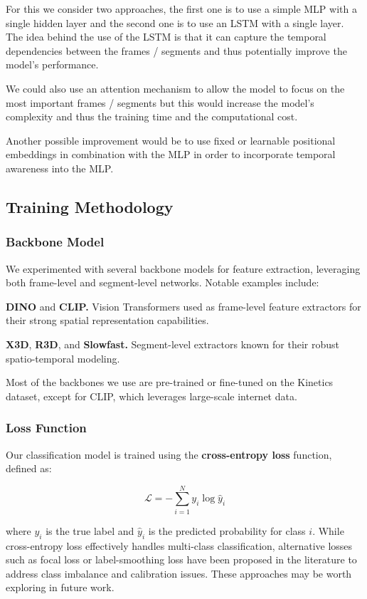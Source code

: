 For this we consider two approaches, the first one is to use a simple MLP with a single hidden layer and the second one is to use an LSTM with a single layer. The idea behind the use of the LSTM is that it can capture the temporal dependencies between the frames / segments and thus potentially improve the model's performance.

We could also use an attention mechanism to allow the model to focus on the most important frames / segments but this would increase the model's complexity and thus the training time and the computational cost.

Another possible improvement would be to use fixed or learnable positional embeddings in combination with the MLP in order to incorporate temporal awareness into the MLP. 


\subsection{Training Methodology}

\subsubsection*{Backbone Model}
We experimented with several backbone models for feature extraction, leveraging both frame-level and segment-level networks. Notable examples include:

\noindent\textbf{\small{DINO}} and \noindent\textbf{\small{CLIP.}} Vision Transformers used as frame-level feature extractors for their strong spatial representation capabilities.

\noindent\textbf{\small{X3D}}, \noindent\textbf{\small{R3D}}, and \noindent\textbf{\small{Slowfast.}} Segment-level extractors known for their robust spatio-temporal modeling.

Most of the backbones we use are pre-trained or fine-tuned on the Kinetics dataset, except for CLIP, which leverages large-scale internet data.

\subsubsection*{Loss Function}
Our classification model is trained using the \textbf{cross-entropy loss} function, defined as:

\[
\mathcal{L} = -\sum_{i=1}^{N} y_i \log \hat{y}_i
\]

where \(y_i\) is the true label and \(\hat{y}_i\) is the predicted probability for class \(i\). While cross-entropy loss effectively handles multi-class classification, alternative losses such as focal loss or label-smoothing loss have been proposed in the literature to address class imbalance and calibration issues. These approaches may be worth exploring in future work.


